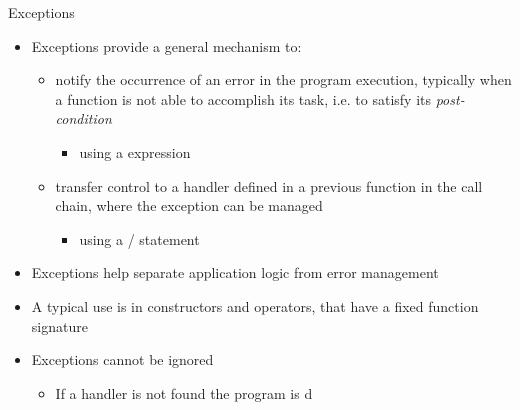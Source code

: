 \begin{frame}[fragile]{Exceptions}

  \begin{itemize}
  \item Exceptions provide a general mechanism to:
    \begin{itemize}
    \item notify the occurrence of an error in the program execution, typically
      when a function is not able to accomplish its task, i.e. to satisfy its
      \textit{post-condition}
      \begin{itemize}
      \item using a  expression
      \end{itemize}
    \item transfer control to a handler defined in a previous function in the call
      chain, where the exception can be managed
      \begin{itemize}
      \item using a / statement
      \end{itemize}
    \end{itemize}
  \item<2-> Exceptions help separate application logic from error management
  \item<3-> A typical use is in constructors and operators, that have a fixed
    function signature
  \item<4-> Exceptions cannot be ignored
    \begin{itemize}
    \item If a handler is not found the program is d
    \end{itemize}
  \end{itemize}

\end{frame}

